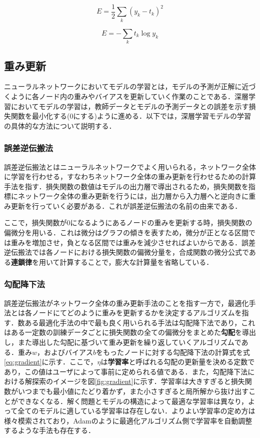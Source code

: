 \documentclass[a4j, 11pt]{jreport}
\begin{document}
\begin{equation}
	E = \frac{1}{2} \sum_{k} ({y_k} - t_k)^2
	\label{eq:mse}
\end{equation}

\begin{equation}
	E = -\sum_{k}t_{k}\log y_{k}
	\label{eq:cee}
\end{equation}

\subsection{重み更新}
ニューラルネットワークにおいてモデルの学習とは，モデルの予測が正解に近づくように各ノード内の重みやバイアスを更新していく作業のことである．深層学習においてモデルの学習は，教師データとモデルの予測データとの誤差を示す損失関数を最小化する(0にする)ように進める．以下では，深層学習モデルの学習の具体的な方法について説明する．
\subsubsection{誤差逆伝搬法}
誤差逆伝搬法とはニューラルネットワークでよく用いられる，ネットワーク全体に学習を行わせる，すなわちネットワーク全体の重み更新を行わせるための計算手法を指す．損失関数の数値はモデルの出力層で導出されるため，損失関数を指標にネットワーク全体の重み更新を行うには，出力層から入力層へと逆向きに重み更新を行っていく必要がある．これが誤差逆伝搬法の名前の由来である．

ここで，損失関数が0になるようにあるノードの重みを更新する時，損失関数の偏微分を用いる．これは微分はグラフの傾きを表すため，微分が正となる区間では重みを増加させ，負となる区間では重みを減少させればよいからである．誤差逆伝搬法では各ノードにおける損失関数の偏微分量を，合成関数の微分公式である\textbf{連鎖律}を用いて計算することで，膨大な計算量を省略している．
\subsubsection{勾配降下法}
誤差逆伝搬法がネットワーク全体の重み更新手法のことを指す一方で，最適化手法とは各ノードにてどのように重みを更新するかを決定するアルゴリズムを指す．数ある最適化手法の中で最も良く用いられる手法は勾配降下法であり，これはある一定数の訓練データごとに損失関数の全ての偏微分をまとめた\textbf{勾配}を導出し，また導出した勾配に基づいて重み更新を繰り返していくアルゴリズムである．重み$w$，およびバイアス$b$をもったノードに対する勾配降下法の計算式を式\ref{eq:gradient}に示す．ここで，$\eta$は\textbf{学習率}と呼ばれる勾配の更新量を決める定数であり，この値はユーザによって事前に定められる値である．また，勾配降下法における解探索のイメージを図\ref{fig:gradient}に示す．学習率は大きすぎると損失関数がいつまでも最小値にたどり着かず，また小さすぎると局所解から抜け出すことができなくなる．解く問題とモデルの構造によって最適な学習率は異なり，よって全てのモデルに適している学習率は存在しない．よりよい学習率の定め方は様々模索されており，Adam\cite{Kingma2015}のように最適化アルゴリズム側で学習率を自動調整するような手法も存在する．
\end{document}
